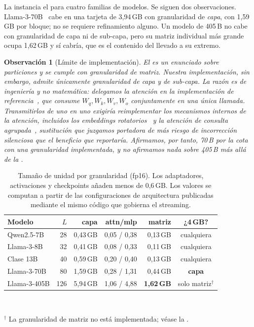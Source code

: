 \documentclass[journal]{IEEEtran}
\newtheorem{remark}[theorem]{Observación}
\begin{document}
La  instancia el  para cuatro familias de modelos. Se siguen dos
observaciones. Llama-3-70B~\cite{grattafiori2024llama3} cabe en una tarjeta de 3,94\,GB con
granularidad de \emph{capa}, con 1,59\,GB por bloque; no se requiere refinamiento alguno. Un modelo
de 405\,B no cabe con granularidad de capa ni de sub-capa, pero su matriz individual más grande
ocupa 1,62\,GB y sí cabría, que es el contenido del  llevado a su extremo.

\begin{remark}[Límite de implementación]
\label{rem:matrixlimit}
El  es un enunciado sobre particiones y se cumple con granularidad de matriz.
Nuestra \emph{implementación}, sin embargo, admite únicamente granularidad de capa y de sub-capa.
La razón es de ingeniería y no matemática: delegamos la atención en la implementación de
referencia~\cite{wolf2020transformers}, que consume $W_q, W_k, W_v, W_o$ conjuntamente en una única
llamada. Transmitirlos de uno en uno exigiría reimplementar los mecanismos internos de la
atención, incluidos los embeddings rotatorios~\cite{su2024roformer} y la atención de consulta
agrupada~\cite{shazeer2019mqa}, sustitución que juzgamos portadora de más riesgo de incorrección
silenciosa que el beneficio que reportaría. Afirmamos, por tanto, 70\,B por la cota con una
granularidad implementada, y no afirmamos nada sobre 405\,B más allá de la .
\end{remark}

\begin{table}[t]
\centering
\caption{Tamaño de unidad por granularidad (fp16). Los adaptadores, activaciones y checkpoints
añaden menos de 0,6\,GB. Los valores se computan a partir de las configuraciones de arquitectura
publicadas mediante el mismo código que gobierna el streaming.}
\label{tab:scaling}
\footnotesize
\begin{tabular}{@{}lrrrrc@{}}
\toprule
\textbf{Modelo} & $L$ & \textbf{capa} & \textbf{attn/mlp} & \textbf{matriz} & \textbf{¿4\,GB?} \\
\midrule
Qwen2.5-7B    & 28  & 0,43\,GB & 0,05 / 0,38 & 0,13\,GB & cualquiera \\
Llama-3-8B    & 32  & 0,41\,GB & 0,08 / 0,33 & 0,11\,GB & cualquiera \\
Clase 13B     & 40  & 0,59\,GB & 0,20 / 0,40 & 0,13\,GB & cualquiera \\
Llama-3-70B   & 80  & 1,59\,GB & 0,28 / 1,31 & 0,44\,GB & \textbf{capa} \\
Llama-3-405B  & 126 & 5,94\,GB & 1,06 / 4,88 & \textbf{1,62\,GB} & solo matriz$^\dagger$ \\
\bottomrule
\end{tabular}
\\[2pt]
\raggedright\footnotesize $^\dagger$ La granularidad de matriz no está implementada; véase la
.
\end{table}
\end{document}
